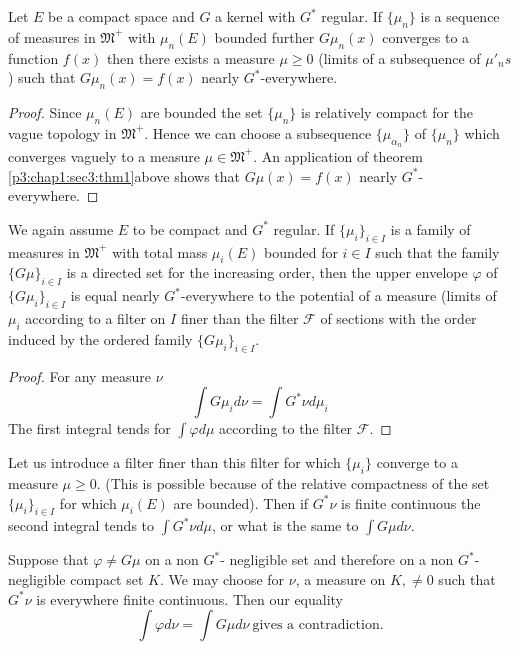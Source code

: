\begin{thm}\label{p3:chap3:sec7:thm4} %
  Let $E$ be a compact space and $G$ a kernel with $G^*$ regular. If
  $\{\mu _n\}$ is a sequence of measures in $\mathfrak{M}^+$ with $\mu
  _n (E)$ bounded further $G \mu_n (x)$ converges to a function $f(x)$
  then there exists a measure $\mu \geq 0$ (limits of a subsequence
  of $\mu'_n s$) such that $G \mu _n (x) = f(x)$ nearly
  $G^*$-everywhere.  
\end{thm}

\begin{proof}
  Since $\mu _n(E)$ are bounded the set $\{ \mu_n\}$ is relatively
  compact for the vague topology in $\mathfrak{M}^+$.  Hence we can
  choose a subsequence $\{ \mu_{\alpha _n}\}$ of $\{\mu _n\}$
  which converges vaguely to a measure $\mu \in \mathfrak{M}^+$. An
  application of theorem \ref{p3:chap1:sec3:thm1}\pageoriginale above shows that $G \mu (x) = f (x)$
  nearly $G^*$-everywhere.  
\end{proof}

\begin{thm}\label{p3:chap3:sec7:thm5} %
  We again assume $E$ to be compact and $G^*$ regular.  If $\{ \mu
  _i\}_{i \in I}$ is a family of measures in $\mathfrak{M}^+$ with
  total mass $\mu_i (E)$ bounded for $i \in I$ such that  the family
  $\{ G \mu \}_{ i \in I}$ is a directed set for the increasing order,
  then the upper envelope $\varphi$ of $\{G \mu_i \}_{i \in I}$ is
  equal nearly $G^*$-everywhere to the potential of a measure (limits
  of $\mu _i $ according to a filter on $I$ finer than the filter $
  \mathscr{F}$ of sections with the order induced by the ordered
  family $\{ G \mu _i\} _{ i \in I}$.  
\end{thm}

\begin{proof}
  For any measure $\nu$
  $$
  \int G \mu_i d \nu = \int G^* \nu d \mu_i 
  $$
  The first integral tends for $\int \varphi d \mu$ according to the
  filter $\mathscr{F}$. 
\end{proof}

Let us introduce a filter finer than this filter for which $\{\mu_i\}$
converge to a measure $\mu \geq 0$. (This is possible because of the
relative compactness of the set $\{ \mu _i \} _{ i \in I}$  for which
$\mu _i (E)$ are bounded). Then if $G^* \nu $ is finite continuous the
second integral tends to $\int G^* \nu d \mu $, or what is the same to
$\int G \mu d \nu$.  

Suppose that $\varphi \neq G \mu$ on a non $G^*$- negligible set and
therefore on a non $G^*$-negligible compact set $K$. We may choose for
$\nu$, a measure on $K, \neq 0$ such that $G^* \nu$ is everywhere
finite continuous. Then our equality  
$$
\int \varphi d \nu = \int G \mu d \nu ~\text{gives a contradiction.}
$$ 

